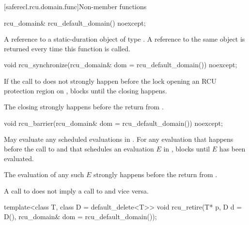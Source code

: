 [saferecl.rcu.domain.func]{Non-member functions}

%
\begin{itemdecl}
rcu_domain& rcu_default_domain() noexcept;
\end{itemdecl}

\begin{itemdescr}
\pnum
\returns
A reference to a static-duration object of type .
A reference to the same object is returned every time this function is called.
\end{itemdescr}

%
\begin{itemdecl}
void rcu_synchronize(rcu_domain& dom = rcu_default_domain()) noexcept;
\end{itemdecl}

\begin{itemdescr}
\pnum
\effects
If the call to  does not strongly happen before
the lock opening an RCU protection region  on ,
blocks until the  closing  happens.

\pnum
\sync
The  closing 
strongly happens before the return from .
\end{itemdescr}

%
\begin{itemdecl}
void rcu_barrier(rcu_domain& dom = rcu_default_domain()) noexcept;
\end{itemdecl}

\begin{itemdescr}
\pnum
\effects
May evaluate any scheduled evaluations in .
For any evaluation that happens before the call to  and
that schedules an evaluation $E$ in ,
blocks until $E$ has been evaluated.

\pnum
\sync
The evaluation of any such $E$
strongly happens before the return from .

\begin{note}
A call to  does not imply
a call to  and vice versa.
\end{note}
\end{itemdescr}

%
\begin{itemdecl}
template<class T, class D = default_delete<T>>
void rcu_retire(T* p, D d = D(), rcu_domain& dom = rcu_default_domain());
\end{itemdecl}

